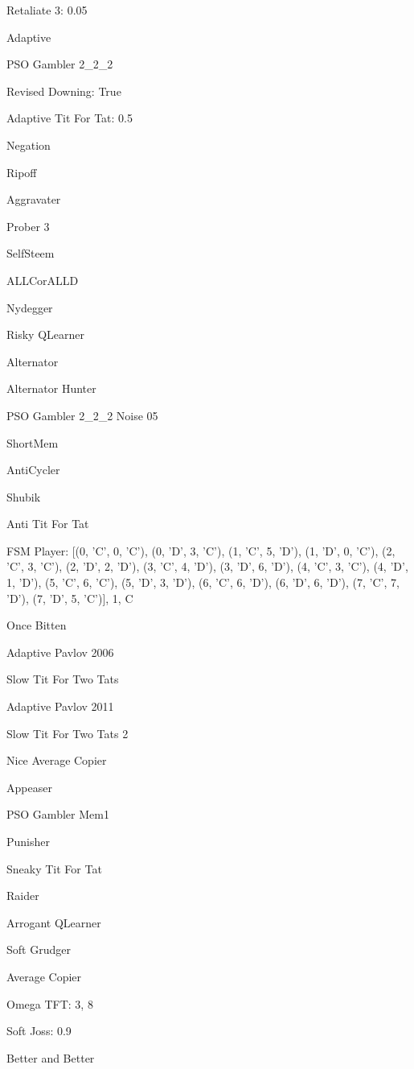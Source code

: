 \item Retaliate 3: 0.05
\item Adaptive
\item PSO Gambler 2\_2\_2
\item Revised Downing: True
\item Adaptive Tit For Tat: 0.5
\item Negation
\item Ripoff
\item Aggravater
\item Prober 3
\item SelfSteem
\item ALLCorALLD
\item Nydegger
\item Risky QLearner
\item Alternator
\item Alternator Hunter
\item PSO Gambler 2\_2\_2 Noise 05
\item ShortMem
\item AntiCycler
\item Shubik
\item Anti Tit For Tat
\item FSM Player: [(0, 'C', 0, 'C'), (0, 'D', 3, 'C'), (1, 'C', 5, 'D'), (1, 'D', 0, 'C'), (2, 'C', 3, 'C'), (2, 'D', 2, 'D'), (3, 'C', 4, 'D'), (3, 'D', 6, 'D'), (4, 'C', 3, 'C'), (4, 'D', 1, 'D'), (5, 'C', 6, 'C'), (5, 'D', 3, 'D'), (6, 'C', 6, 'D'), (6, 'D', 6, 'D'), (7, 'C', 7, 'D'), (7, 'D', 5, 'C')], 1, C
\item Once Bitten
\item Adaptive Pavlov 2006
\item Slow Tit For Two Tats
\item Adaptive Pavlov 2011
\item Slow Tit For Two Tats 2
\item Nice Average Copier
\item Appeaser
\item PSO Gambler Mem1
\item Punisher
\item Sneaky Tit For Tat
\item Raider
\item Arrogant QLearner
\item Soft Grudger
\item Average Copier
\item Omega TFT: 3, 8
\item Soft Joss: 0.9
\item Better and Better
